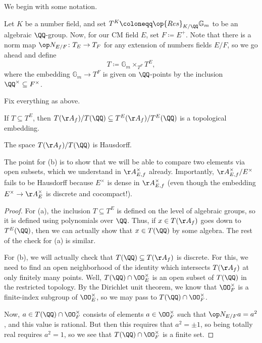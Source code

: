\documentclass[../notes.tex]{subfiles}
\begin{document}
We begin with some notation.
\begin{notation}
	Let $K$ be a number field, and set $T^K\coloneqq\op{Res}_{K/\QQ}\mathbb G_m$ to be an algebraic $\QQ$-group. Now, for our CM field $E$, set $F\coloneqq E^+$. Note that there is a norm map $\op N_{E/F}\colon T_E\to T_F$ for any extension of numbers fields $E/F$, so we go ahead and define
	\[T\coloneqq\mathbb G_m\times_{T^F}T^E,\]
	where the embedding $\mathbb G_m\to T^F$ is given on $\QQ$-points by the inclusion $\QQ^\times\subseteq F^\times$.
\end{notation}
\begin{lemma} \label{lem:get-to-hausdorff-quotient}
	Fix everything as above.
	\begin{listalph}
		\item If $T\subseteq T^E$, then $T(\AA_{f})/T(\QQ)\subseteq T^E(\AA_f)/T^E(\QQ)$ is a topological embedding. 
		\item The space $T(\AA_f)/T(\QQ)$ is Hausdorff.
	\end{listalph}
\end{lemma}
The point for (b) is to show that we will be able to compare two elements via open subsets, which we understand in $\AA_{E,f}^\times$ already. Importantly, $\AA_{E,f}^\times/E^\times$ fails to be Hausdorff because $E^\times$ is dense in $\AA_{E,f}^\times$ (even though the embedding $E^\times\to\AA_{E}^\times$ is discrete and cocompact!).
\begin{proof}
	For (a), the inclusion $T\subseteq T^E$ is defined on the level of algebraic groups, so it is defined using polynomials over $\QQ$. Thus, if $x\in T(\AA_f)$ goes down to $T^E(\QQ)$, then we can actually show that $x\in T(\QQ)$ by some algebra. The rest of the check for (a) is similar.

	For (b), we will actually check that $T(\QQ)\subseteq T(\AA_f)$ is discrete. For this, we need to find an open neighborhood of the identity which intersects $T(\AA_f)$ at only finitely many points. Well, $T(\QQ)\cap\OO_E^\times$ is an open subset of $T(\QQ)$ in the restricted topology. By the Dirichlet unit theorem, we know that $\OO_F^\times$ is a finite-index subgroup of $\OO_E^\times$, so we may pass to $T(\QQ)\cap\OO_F^\times$.

	Now, $a\in T(\QQ)\cap\OO_F^\times$ consists of elements $a\in\OO_F^\times$ such that $\op N_{E/F}a=a^2$, and this value is rational. But then this requires that $a^2=\pm1$, so being totally real requires $a^2=1$, so we see that $T(\QQ)\cap\OO_F^\times$ is a finite set.
\end{proof}
\end{document}
